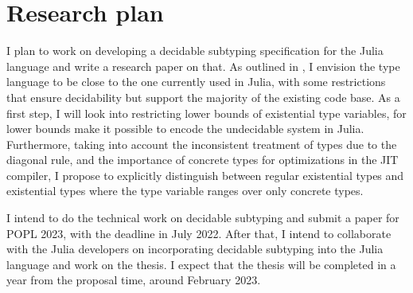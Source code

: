 \chapter{Research plan}\label{chap:6}

I plan to work on developing a decidable subtyping specification for the Julia
language and write a research paper on that.
As outlined in , I envision the type language to be close to the
one currently used in Julia, with some restrictions that ensure decidability
but support the majority of the existing code base.
As a first step, I will look into restricting lower bounds of existential type
variables, for lower bounds make it possible to encode the undecidable
system \FSub in Julia. Furthermore, taking into account the inconsistent
treatment of types due to the diagonal rule,
and the importance of concrete types for optimizations in the JIT compiler,
I propose to explicitly distinguish between regular existential types
and existential types where the type variable ranges over only concrete types.

I intend to do the technical work on decidable subtyping and submit a paper
for POPL 2023, with the deadline in July 2022.
After that, I intend to collaborate with the Julia developers on incorporating
decidable subtyping into the Julia language and work on the thesis.
I expect that the thesis will be completed in a year from the proposal time,
around February 2023.


